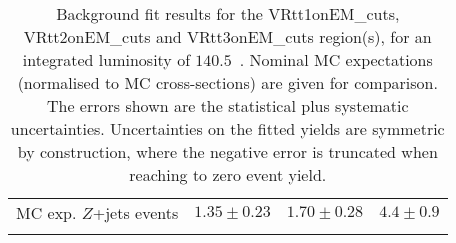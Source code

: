 \begin{table}
\begin{center}
{\begin{tabular*}{\textwidth}{@{\extracolsep{\fill}}lrrr}
        MC exp. $Z$+jets events         & $1.35 \pm 0.23$          & $1.70 \pm 0.28$          & $4.4 \pm 0.9$              \\
\noalign{\smallskip}\hline\noalign{\smallskip}
\end{tabular*}
}
\end{center}
\caption{ Background fit results for the VRtt1onEM\_cuts, VRtt2onEM\_cuts and VRtt3onEM\_cuts region(s),  for an integrated luminosity of $140.5$~\ifb.
Nominal MC expectations (normalised to MC cross-sections) are given for comparison. 
The errors shown are the statistical plus systematic uncertainties.
Uncertainties on the fitted yields are symmetric by construction, 
where the negative error is truncated when reaching to zero event yield.
}
\label{table.results.yields.fit.VR}
\end{table}
%